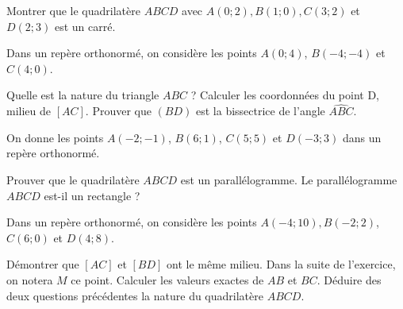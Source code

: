 \documentclass[a4paper,12pt]{report}
\begin{document}
\begin{boiteExT}
    \vspace{18cm}
\end{boiteExT}

\begin{exo}
	Montrer que le quadrilatère $ABCD$ avec $A(0;2), B(1;0), C(3;2)$ et $D(2;3)$ est un carré.
\end{exo}
\begin{exo}
Dans un repère orthonormé, on considère les points $A (0; 4)$, $B (−4; −4)$ et $C (4; 0)$.

\begin{tasks}
\task	Quelle est la nature du triangle $ABC$ ?
\task	Calculer les coordonnées du point D, milieu de $[AC]$.
\task	Prouver que $(BD)$ est la bissectrice de l’angle $\hat{ABC}$.
\end{tasks}

\end{exo}

\begin{exo}
On donne les points $A (−2; −1)$, $B (6; 1)$, $C (5; 5)$ et $D (−3; 3)$ dans un repère orthonormé.

	\begin{tasks}
		\task Prouver que le quadrilatère $ABCD$ est un parallélogramme.
		\task Le parallélogramme $ABCD$ est-il un rectangle ?
	\end{tasks}
\end{exo}
\begin{exo}
	Dans un repère orthonormé, on considère les points $A (−4; 10), B (−2; 2)$, $C (6; 0)$ et $D (4; 8)$.
	\begin{tasks}
		\task Démontrer que $[AC]$ et $[BD]$ ont le même milieu.  Dans la suite de l’exercice, on notera $M$ ce point.
		\task Calculer les valeurs exactes de $AB$ et $BC$.
		\task Déduire des deux questions précédentes la nature du
quadrilatère $ABCD$.
	\end{tasks}
\end{exo}
\end{document}
